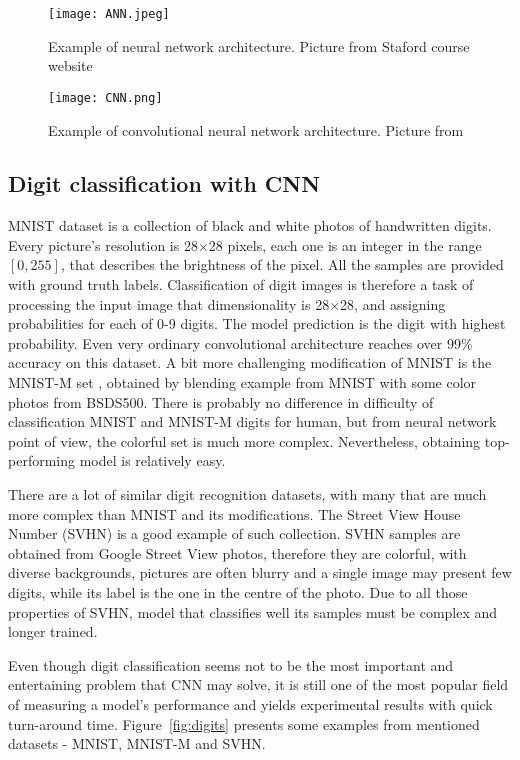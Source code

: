 \documentclass{article}
\begin{document}
\begin{figure}[htb]%
    \centering
    \texttt{[image: ANN.jpeg]}%
    \caption{Example of neural network architecture. Picture from Staford course website \cite{stanford}}%
    \label{fig:ANN}%
\end{figure}
\begin{figure}[htb]%
    \centering
    \texttt{[image: CNN.png]}%
    \caption{Example of convolutional neural network architecture. Picture from \cite{cnn_im}}%
    \label{fig:CNN}%
\end{figure}

\subsection{Digit classification with CNN}
MNIST dataset \cite{mnist} is a collection of black and white photos of handwritten digits. Every picture's resolution is 28$\times$28 pixels, each one is an integer in the range $[0,255]$, that describes the brightness of the pixel. All the samples are provided with ground truth labels. Classification of digit images is therefore a task of processing the input image that dimensionality is 28$\times$28, and assigning probabilities for each of 0-9 digits. The model prediction is the digit with highest probability. Even very ordinary convolutional architecture reaches over 99\% accuracy on this dataset. A bit more challenging modification of MNIST is the MNIST-M set \cite{mnist-m}, obtained by blending example from MNIST with some color photos from BSDS500. There is probably no difference in difficulty of classification MNIST and MNIST-M digits for human, but from neural network point of view, the colorful set is much more complex. Nevertheless, obtaining top-performing model is relatively easy.
\par
There are a lot of similar digit recognition datasets, with many that are much more complex than MNIST and its modifications. The Street View House Number (SVHN) is a good example of such collection. SVHN samples are obtained from Google Street View photos, therefore they are colorful, with diverse backgrounds, pictures are often blurry and a single image may present few digits, while its label is the one in the centre of the photo. Due to all those properties of SVHN, model that classifies well its samples must be complex and longer trained. 
\par
Even though digit classification seems not to be the most important and entertaining problem that CNN may solve, it is still one of the most popular field of measuring a model's performance and yields experimental results with quick turn-around time. Figure~\ref{fig:digits} presents some examples from mentioned datasets - MNIST, MNIST-M and SVHN.
\end{document}
